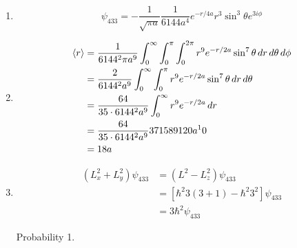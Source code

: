 \documentclass{article}
\begin{document}
\subsection{}

\begin{enumerate}
  \item \[\psi_{4 3 3} = -\frac{1}{\sqrt{\pi a}} \frac{1}{6144 a^4} e^{-r / 4 a} r^3 \sin^3 \theta e^{3 i \phi}\]

  \item

        \begin{align*}
          \braket{r} & = \frac{1}{6144^2 \pi a^9} \int_0^\infty \int_0^\pi \int_0^{2 \pi} r^9 e^{-r / 2 a} \sin^7 \theta \,d r \,d \theta \,d \phi \\
                     & = \frac{2}{6144^2 a^9} \int_0^\infty \int_0^\pi r^9 e^{-r / 2 a} \sin^7 \theta \,d r \,d \theta                             \\
                     & = \frac{64}{35 \cdot 6144^2 a^9} \int_0^\infty r^9 e^{-r / 2 a} \,d r                                                       \\
                     & = \frac{64}{35 \cdot 6144^2 a^9} 371589120 a^10                                                                             \\
                     & = 18 a
        \end{align*}

  \item

        \begin{align*}
          (L_x^2 + L_y^2) \psi_{4 3 3} & = (L^2 - L_z^2) \psi_{4 3 3}                     \\
                                       & = [\hbar^2 3 (3 + 1) - \hbar^2 3^2] \psi_{4 3 3} \\
                                       & = 3 \hbar^2 \psi_{4 3 3}
        \end{align*}

        Probability 1.
\end{enumerate}

\subsection{}
\end{document}
